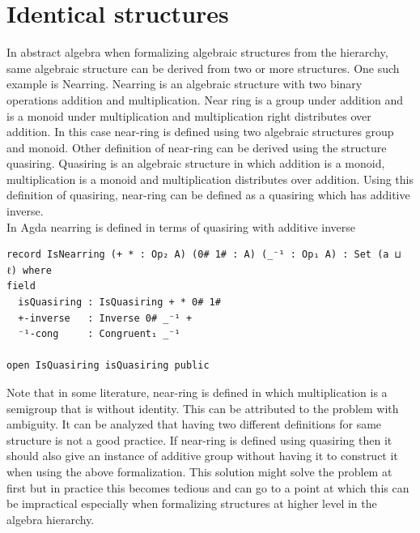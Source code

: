 \section{Identical structures}
In abstract algebra when formalizing algebraic structures from the hierarchy,
same algebraic structure can be derived from two or more structures. One such
example is Nearring. Nearring is an algebraic structure with two binary
operations addition and multiplication. Near ring is a group under addition and
is a monoid under multiplication and multiplication right distributes over
addition. In this case near-ring is defined using two algebraic structures group
and monoid. Other definition of near-ring can be derived using the structure
quasiring. Quasiring is an algebraic structure in which addition is a monoid,
multiplication is a monoid and multiplication distributes over addition. Using
this definition of quasiring, near-ring can be defined as a quasiring which has
additive inverse. \\
In Agda nearring is defined in terms of quasiring with additive inverse 
\begin{verbatim}
record IsNearring (+ * : Op₂ A) (0# 1# : A) (_⁻¹ : Op₁ A) : Set (a ⊔ ℓ) where
field
  isQuasiring : IsQuasiring + * 0# 1#
  +-inverse   : Inverse 0# _⁻¹ +
  ⁻¹-cong     : Congruent₁ _⁻¹

open IsQuasiring isQuasiring public
\end{verbatim}
Note that in some literature, near-ring is defined in which multiplication is a
semigroup that is without identity. This can be attributed to the problem with
ambiguity. It can be analyzed that having two different definitions for same
structure is not a good practice. If near-ring is defined using quasiring then
it should also give an instance of additive group without having it to construct
it when using the above formalization. This solution might solve the problem at
first but in practice this becomes tedious and can go to a point at which this
can be impractical especially when formalizing structures at higher level in the
algebra hierarchy.

